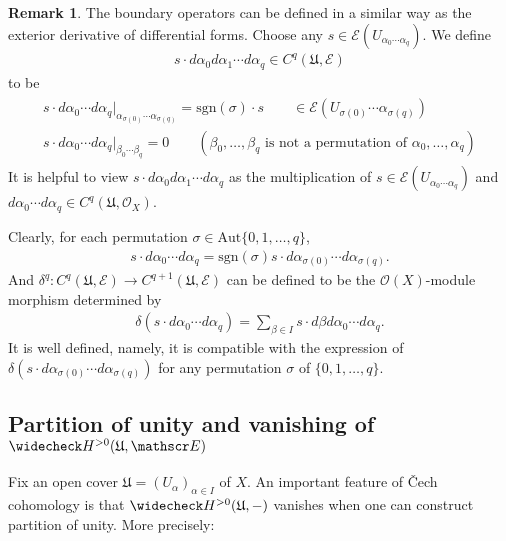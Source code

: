 \documentclass[12pt,b5paper,notitlepage]{report}
\theoremstyle{definition}
\newtheorem{rem}[df]{Remark}
\theoremstyle{plain}
\newcommand{\fk}{\mathfrak}
\newcommand{\wch}{\widecheck}
\newcommand{\scr}{\mathscr}
\newcommand{\sgn}{\mathrm{sgn}}
\newcommand{\Aut}{\mathrm{Aut}}
\numberwithin{equation}{section}
\begin{document}
\begin{rem}
The boundary operators can be defined in a similar way as the exterior derivative of differential forms. Choose any $s\in\scr E(U_{\alpha_0\cdots\alpha_q})$. We define \index{sda@$sd\alpha_0d\alpha_1\cdots d\alpha_q\in C^q(\fk U,\scr E)$} 
\begin{align*}
s\cdot d\alpha_0d\alpha_1\cdots d\alpha_q\in C^q(\fk U,\scr E)
\end{align*}
to be
\begin{gather}
\begin{gathered}
s\cdot d\alpha_0\cdots d\alpha_q|_{\alpha_{\sigma(0)}\cdots\alpha_{\sigma(q)}}=\sgn(\sigma)\cdot s\qquad\in \scr E(U_{\sigma(0)}\cdots\alpha_{\sigma(q)})\\
s\cdot d\alpha_0\cdots d\alpha_q|_{\beta_0\cdots\beta_q}=0\qquad(\beta_0,\dots,\beta_q\text{ is not a permutation of }\alpha_0,\dots,\alpha_q)
\end{gathered}
\end{gather}
It is helpful to view $s\cdot d\alpha_0d\alpha_1\cdots d\alpha_q$ as the multiplication of $s\in\scr E(U_{\alpha_0\cdots\alpha_q})$ and $d\alpha_0\cdots d\alpha_q\in C^q(\fk U,\scr O_X)$.

Clearly, for each permutation $\sigma\in\Aut\{0,1,\dots,q\}$,
\begin{align*}
s\cdot d\alpha_0\cdots d\alpha_q=\sgn(\sigma)s\cdot d\alpha_{\sigma(0)}\cdots d\alpha_{\sigma(q)}.
\end{align*}
And $\delta^q:C^q(\fk U,\scr E)\rightarrow C^{q+1}(\fk U,\scr E)$ can be defined to be the $\scr O(X)$-module morphism determined by
\begin{align}
\delta(s\cdot d\alpha_0\cdots d\alpha_q)=\sum_{\beta\in I}s\cdot d\beta d\alpha_0\cdots d\alpha_q.  \label{eq141}
\end{align}
It is well defined, namely, it is compatible with the expression of $\delta(s\cdot d\alpha_{\sigma(0)}\cdots d\alpha_{\sigma(q)})$ for any permutation $\sigma$ of $\{0,1,\dots,q\}$. \hfill\qedsymbol
\end{rem}

\subsection{Partition of unity and vanishing of $\wch H^{>0}(\fk U,\scr E)$}


Fix an open cover $\fk U=(U_\alpha)_{\alpha\in I}$ of $X$. An important feature of \v Cech cohomology is that $\wch H^{>0}(\fk U,-)$ vanishes when one can construct partition of unity. More precisely:
\end{document}
